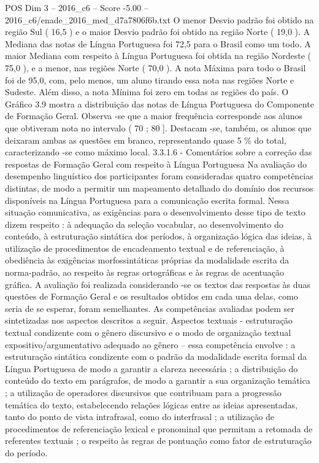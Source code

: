 \begin{textsample}{POS Dim 3 – 2016\_c6 – Score -5.00 – 2016\_c6/enade\_2016\_med\_d7a7806f6b.txt}
O menor Desvio padrão foi obtido na região Sul ( 16,5 ) e o maior Desvio padrão foi obtido na região Norte ( 19,0 ).
A Mediana das notas de Língua Portuguesa foi 72,5 para o Brasil como um todo.
A maior Mediana com respeito à Língua Portuguesa foi obtida na região Nordeste ( 75,0 ), e a menor, nas regiões Norte ( 70,0 ).
A nota Máxima para todo o Brasil foi de 95,0, com, pelo menos, um aluno tirando essa nota nas regiões Norte e Sudeste.
Além disso, a nota Mínima foi zero em todas as regiões do país.
O Gráfico 3.9 mostra a distribuição das notas de Língua Portuguesa do Componente de Formação Geral.
Observa -se que a maior frequência corresponde aos alunos que obtiveram nota no intervalo ( 70 ; 80 ].
Destacam -se, também, os alunos que deixaram ambas as questões em branco, representando quase 5 \% do total, caracterizando -se como máximo local. 3.3.1.6 - Comentários sobre a correção das respostas de Formação Geral com respeito à Língua Portuguesa Na avaliação do desempenho linguístico dos participantes foram consideradas quatro competências distintas, de modo a permitir um mapeamento detalhado do domínio dos recursos disponíveis na Língua Portuguesa para a comunicação escrita formal.
Nessa situação comunicativa, as exigências para o desenvolvimento desse tipo de texto dizem respeito : à adequação da seleção vocabular, ao desenvolvimento do conteúdo, à estruturação sintática dos períodos, à organização lógica das ideias, à utilização de procedimentos de encadeamento textual e de referenciação, à obediência às exigências morfossintáticas próprias da modalidade escrita da norma-padrão, ao respeito às regras ortográficas e às regras de acentuação gráfica.
A avaliação foi realizada considerando -se os textos das respostas às duas questões de Formação Geral e os resultados obtidos em cada uma delas, como seria de se esperar, foram semelhantes.
As competências avaliadas podem ser sintetizadas nos aspectos descritos a seguir.
Aspectos textuais - estruturação textual condizente com o gênero discursivo e o modo de organização textual expositivo/argumentativo adequado ao gênero – essa competência envolve : a estruturação sintática condizente com o padrão da modalidade escrita formal da Língua Portuguesa de modo a garantir a clareza necessária ; a distribuição do conteúdo do texto em parágrafos, de modo a garantir a sua organização temática ; a utilização de operadores discursivos que contribuam para a progressão temática do texto, estabelecendo relações lógicas entre as ideias apresentadas, tanto do ponto de vista intrafrasal, como do interfrasal ; a utilização de procedimentos de referenciação lexical e pronominal que permitam a retomada de referentes textuais ; o respeito às regras de pontuação como fator de estruturação do período.

\end{textsample}
